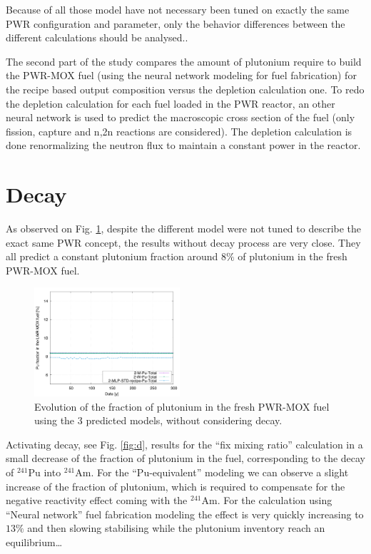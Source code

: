 \documentclass{anstrans}
\begin{document}
Because of all those model have not necessary been tuned on exactly the same
PWR configuration and parameter, only the behavior differences between the
different calculations should be analysed..


The second part of the study compares the amount of plutonium require to build
the PWR-MOX fuel (using the neural network modeling for fuel fabrication) for
the recipe based output composition versus the depletion calculation one.
To redo the depletion calculation for each fuel loaded in the PWR reactor, an
other neural network is used to predict the macroscopic cross section of the
fuel \cite{NN_CLASS} (only fission, capture and n,2n reactions are considered). The
depletion calculation is done renormalizing the neutron flux to maintain a
constant power in the reactor.


\section{Decay}


As observed on Fig. \ref{fig:nod}, despite the different model were not tuned to
describe the exact same PWR concept, the results without decay process are very
close. They all predict a constant plutonium fraction around $8\%$ of plutonium
in the fresh PWR-MOX fuel.

\begin{figure}[ht] %
  \centering
  \includegraphics[width=0.48\textwidth]{nodecay_pu_contribution.png}
  \caption{Evolution of the fraction of plutonium in the fresh PWR-MOX fuel
  using the 3 predicted models, without considering decay.}
  \label{fig:nod}
\end{figure}


Activating decay, see Fig. \ref{fig:d}, results for the ``fix mixing ratio''
calculation in a small decrease of the fraction of plutonium in the fuel,
corresponding to the decay of $^{241}$Pu into $^{241}$Am. For the
``Pu-equivalent'' modeling we can observe a slight increase of the fraction of
plutonium, which is required to compensate for the negative reactivity effect
coming with the $^{241}$Am. For the calculation using ``Neural network'' fuel
fabrication modeling the effect is very quickly increasing to $13\%$ and then
slowing stabilising while the plutonium inventory reach an equilibrium\ldots
\end{document}
